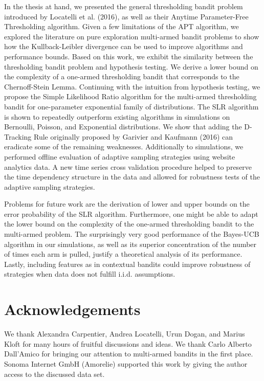 \documentclass[11pt,]{article}
\begin{document}
In the thesis at hand, we presented the general thresholding bandit
problem introduced by Locatelli et al. (2016), as well as their Anytime
Parameter-Free Thresholding algorithm. Given a few limitations of the
APT algorithm, we explored the literature on pure exploration
multi-armed bandit problems to show how the Kullback-Leibler divergence
can be used to improve algorithms and performance bounds. Based on this
work, we exhibit the similarity between the thresholding bandit problem
and hypothesis testing. We derive a lower bound on the complexity of a
one-armed thresholding bandit that corresponds to the Chernoff-Stein
Lemma. Continuing with the intuition from hypothesis testing, we propose
the Simple Likelihood Ratio algorithm for the multi-armed thresholding
bandit for one-parameter exponential family of distributions. The SLR
algorithm is shown to repeatedly outperform existing algorithms in
simulations on Bernoulli, Poisson, and Exponential distributions. We
show that adding the D-Tracking Rule originally proposed by Garivier and
Kaufmann (2016) can eradicate some of the remaining weaknesses.
Additionally to simulations, we performed offline evaluation of adaptive
sampling strategies using website analytics data. A new time series
cross validation procedure helped to preserve the time dependency
structure in the data and allowed for robustness tests of the adaptive
sampling strategies.

Problems for future work are the derivation of lower and upper bounds on
the error probability of the SLR algorithm. Furthermore, one might be
able to adapt the lower bound on the complexity of the one-armed
thresholding bandit to the multi-armed problem. The surprisingly very
good performance of the Bayes-UCB algorithm in our simulations, as well
as its superior concentration of the number of times each arm is pulled,
justify a theoretical analysis of its performance. Lastly, including
features as in contextual bandits could improve robustness of strategies
when data does not fulfill i.i.d. assumptions.

\section{Acknowledgements}\label{acknowledgements}

We thank Alexandra Carpentier, Andrea Locatelli, Urun Dogan, and Marius
Kloft for many hours of fruitful discussions and ideas. We thank Carlo
Alberto Dall'Amico for bringing our attention to multi-armed bandits in
the first place. Sonoma Internet GmbH (Amorelie) supported this work by
giving the author access to the discussed data set.
\end{document}
